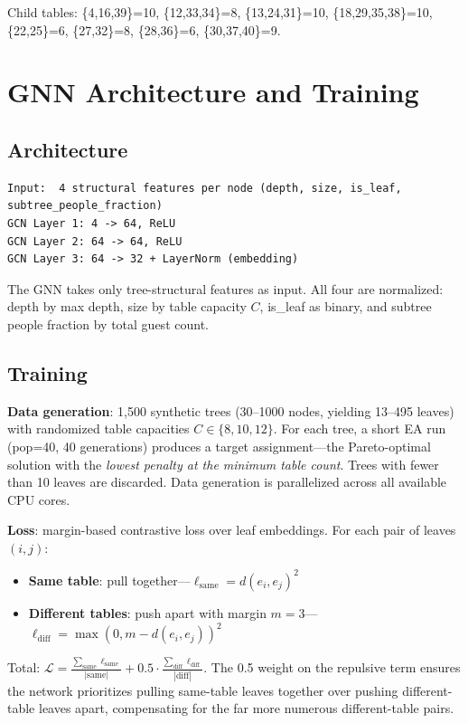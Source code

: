 \documentclass[11pt,a4paper]{article}
\begin{document}
Child tables: \{4,16,39\}=10, \{12,33,34\}=8, \{13,24,31\}=10, \{18,29,35,38\}=10, \{22,25\}=6, \{27,32\}=8, \{28,36\}=6, \{30,37,40\}=9.

\section{GNN Architecture and Training}

\subsection{Architecture}
\begin{lstlisting}
Input:  4 structural features per node (depth, size, is_leaf, subtree_people_fraction)
GCN Layer 1: 4 -> 64, ReLU
GCN Layer 2: 64 -> 64, ReLU
GCN Layer 3: 64 -> 32 + LayerNorm (embedding)
\end{lstlisting}

The GNN takes only tree-structural features as input.  All four are normalized: depth by max depth, size by table capacity $C$, is\_leaf as binary, and subtree people fraction by total guest count.

\subsection{Training}

\textbf{Data generation}: 1,500 synthetic trees (30--1000 nodes, yielding 13--495 leaves) with randomized table capacities $C \in \{8, 10, 12\}$.  For each tree, a short EA run (pop=40, 40 generations) produces a target assignment---the Pareto-optimal solution with the \emph{lowest penalty at the minimum table count}.  Trees with fewer than 10 leaves are discarded.  Data generation is parallelized across all available CPU cores.

\textbf{Loss}: margin-based contrastive loss over leaf embeddings.  For each pair of leaves $(i, j)$:
\begin{itemize}[nosep]
    \item \textbf{Same table}: pull together---$\ell_{\text{same}} = d(e_i, e_j)^2$
    \item \textbf{Different tables}: push apart with margin $m=3$---$\ell_{\text{diff}} = \max(0, m - d(e_i, e_j))^2$
\end{itemize}
Total: $\mathcal{L} = \frac{\sum_{\text{same}} \ell_{\text{same}}}{|\text{same}|} + 0.5 \cdot \frac{\sum_{\text{diff}} \ell_{\text{diff}}}{|\text{diff}|}$.  The 0.5 weight on the repulsive term ensures the network prioritizes pulling same-table leaves together over pushing different-table leaves apart, compensating for the far more numerous different-table pairs.
\end{document}

